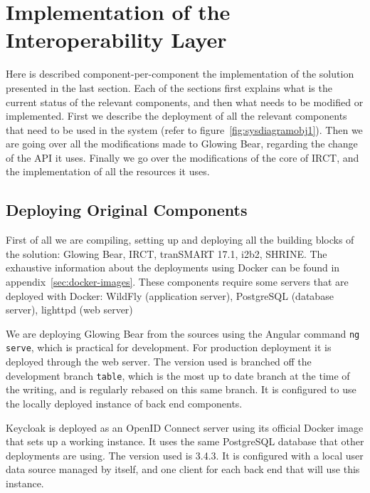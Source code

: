 \newpage
\section{Implementation of the Interoperability Layer}
Here is described component-per-component the implementation of the solution presented in the last section. 
Each of the sections first explains what is the current status of the relevant components, and then what needs to be modified or implemented.
First we describe the deployment of all the relevant components that need to be used in the system (refer to figure~\ref{fig:sysdiagramobj1}).
Then we are going over all the modifications made to Glowing Bear, regarding the change of the API it uses.
Finally we go over the modifications of the core of IRCT, and the implementation of all the resources it uses.


\subsection{Deploying Original Components}

First of all we are compiling, setting up and deploying all the building blocks of the solution: Glowing Bear, IRCT, tranSMART 17.1, i2b2, SHRINE.
The exhaustive information about the deployments using Docker can be found in appendix~\ref{sec:docker-images}.
These components require some servers that are deployed with Docker: WildFly (application server), PostgreSQL (database server), lighttpd (web server)

We are deploying Glowing Bear from the sources using the Angular command \verb|ng serve|, which is practical for development.
For production deployment it is deployed through the web server.
The version used is branched off the development branch \verb|table|, which is the most up to date branch at the time of the writing, and is regularly rebased on this same branch.
It is configured to use the locally deployed instance of back end components.

Keycloak is deployed as an OpenID Connect server using its official Docker image that sets up a working instance.
It uses the same PostgreSQL database that other deployments are using.
The version used is 3.4.3.
It is configured with a local user data source managed by itself, and one client for each back end that will use this instance.

